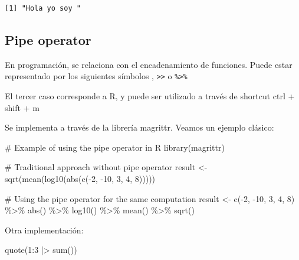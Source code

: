\documentclass[
  letterpaper,
  DIV=11,
  numbers=noendperiod]{scrartcl}
\newenvironment{Shaded}{\begin{snugshade}}{\end{snugshade}}
\newcommand{\CommentTok}[1]{\textcolor[rgb]{0.37,0.37,0.37}{#1}}
\newcommand{\DecValTok}[1]{\textcolor[rgb]{0.68,0.00,0.00}{#1}}
\newcommand{\FunctionTok}[1]{\textcolor[rgb]{0.28,0.35,0.67}{#1}}
\newcommand{\NormalTok}[1]{\textcolor[rgb]{0.00,0.23,0.31}{#1}}
\newcommand{\OtherTok}[1]{\textcolor[rgb]{0.00,0.23,0.31}{#1}}
\newcommand{\SpecialCharTok}[1]{\textcolor[rgb]{0.37,0.37,0.37}{#1}}
\begin{document}
\begin{verbatim}
[1] "Hola yo soy "
\end{verbatim}

\subsection{Pipe operator}\label{pipe-operator}

En programación, se relaciona con el encadenamiento de funciones. Puede
estar representado por los siguientes símbolos \texttt{\textbar{}},
\texttt{\textgreater{}\textgreater{}} o \texttt{\%\textgreater{}\%}

El tercer caso corresponde a R, y puede ser utilizado a través de
shortcut ctrl + shift + m

Se implementa a través de la librería magrittr. Veamos un ejemplo
clásico:

\begin{Shaded}
\begin{Highlighting}[]
\CommentTok{\# Example of using the pipe operator in R}
\FunctionTok{library}\NormalTok{(magrittr)}

\CommentTok{\# Traditional approach without pipe operator}
\NormalTok{result }\OtherTok{\textless{}{-}} \FunctionTok{sqrt}\NormalTok{(}\FunctionTok{mean}\NormalTok{(}\FunctionTok{log10}\NormalTok{(}\FunctionTok{abs}\NormalTok{(}\FunctionTok{c}\NormalTok{(}\SpecialCharTok{{-}}\DecValTok{2}\NormalTok{, }\SpecialCharTok{{-}}\DecValTok{10}\NormalTok{, }\DecValTok{3}\NormalTok{, }\DecValTok{4}\NormalTok{, }\DecValTok{8}\NormalTok{)))))}

\CommentTok{\# Using the pipe operator for the same computation}
\NormalTok{result }\OtherTok{\textless{}{-}} \FunctionTok{c}\NormalTok{(}\SpecialCharTok{{-}}\DecValTok{2}\NormalTok{, }\SpecialCharTok{{-}}\DecValTok{10}\NormalTok{, }\DecValTok{3}\NormalTok{, }\DecValTok{4}\NormalTok{, }\DecValTok{8}\NormalTok{) }\SpecialCharTok{\%\textgreater{}\%} \FunctionTok{abs}\NormalTok{() }\SpecialCharTok{\%\textgreater{}\%} \FunctionTok{log10}\NormalTok{() }\SpecialCharTok{\%\textgreater{}\%} \FunctionTok{mean}\NormalTok{() }\SpecialCharTok{\%\textgreater{}\%} \FunctionTok{sqrt}\NormalTok{()}
\end{Highlighting}
\end{Shaded}

Otra implementación:

\begin{Shaded}
\begin{Highlighting}[]
\FunctionTok{quote}\NormalTok{(}\DecValTok{1}\SpecialCharTok{:}\DecValTok{3} \SpecialCharTok{|\textgreater{}} \FunctionTok{sum}\NormalTok{())}
\end{Highlighting}
\end{Shaded}
\end{document}
